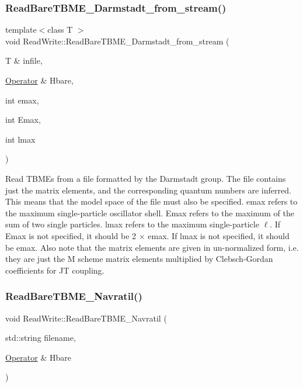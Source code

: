 \subsubsection{\texorpdfstring{Read\+Bare\+T\+B\+M\+E\+\_\+\+Darmstadt\+\_\+from\+\_\+stream()}{ReadBareTBME\_Darmstadt\_from\_stream()}}
{\footnotesize\ttfamily template$<$class T $>$ \\
void Read\+Write\+::\+Read\+Bare\+T\+B\+M\+E\+\_\+\+Darmstadt\+\_\+from\+\_\+stream (\begin{DoxyParamCaption}\item[{T \&}]{infile,  }\item[{\hyperlink{classOperator}{Operator} \&}]{Hbare,  }\item[{int}]{emax,  }\item[{int}]{Emax,  }\item[{int}]{lmax }\end{DoxyParamCaption})}

Read T\+B\+ME\textquotesingle{}s from a file formatted by the Darmstadt group. The file contains just the matrix elements, and the corresponding quantum numbers are inferred. This means that the model space of the file must also be specified. emax refers to the maximum single-\/particle oscillator shell. Emax refers to the maximum of the sum of two single particles. lmax refers to the maximum single-\/particle $ \ell $. If Emax is not specified, it should be 2 $\times$ emax. If lmax is not specified, it should be emax. Also note that the matrix elements are given in un-\/normalized form, i.\+e. they are just the M scheme matrix elements multiplied by Clebsch-\/\+Gordan coefficients for JT coupling. \mbox{\label{classReadWrite_ac69ea7db65be10e8b63a3adf4cf6848d}} 
\subsubsection{\texorpdfstring{Read\+Bare\+T\+B\+M\+E\+\_\+\+Navratil()}{ReadBareTBME\_Navratil()}}
{\footnotesize\ttfamily void Read\+Write\+::\+Read\+Bare\+T\+B\+M\+E\+\_\+\+Navratil (\begin{DoxyParamCaption}\item[{std\+::string}]{filename,  }\item[{\hyperlink{classOperator}{Operator} \&}]{Hbare }\end{DoxyParamCaption})}

